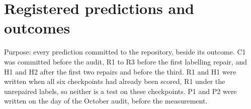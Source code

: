 \begin{table}[h]
\centering\small
\caption{Hand audit of the labels after the first two repairs, thirty items per run stratified over failure modes, Wilson intervals. All errors are correct calls scored as failures.}
\label{tab:postaudit}

\end{table}

\section{Registered predictions and outcomes}
\label{app:registry}

Purpose: every prediction committed to the repository, beside its outcome. C1 was committed before the audit, R1 to R3 before the first labelling repair, and H1 and H2 after the first two repairs and before the third. R1 and H1 were written when all six checkpoints had already been scored, R1 under the unrepaired labels, so neither is a test on these checkpoints. P1 and P2 were written on the day of the October audit, before the measurement.

